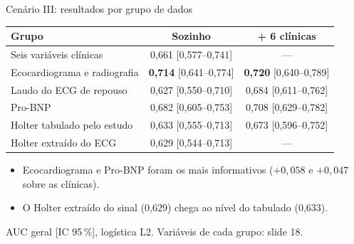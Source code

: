 \documentclass[10pt,aspectratio=169]{beamer}
\newcommand{\fonte}[1]{\par\vfill{\scriptsize\color{cinza}#1}}
\begin{document}
\begin{frame}{Cenário III: resultados por grupo de dados}
  \centering
  \small
  \setlength{\tabcolsep}{6pt}
  \renewcommand{\arraystretch}{1.3}
  \begin{tabular}{lcc}
    \toprule
    \textbf{Grupo} & \textbf{Sozinho} & \textbf{+ 6 clínicas} \\
    \midrule
    Seis variáveis clínicas & 0,661 [0,577--0,741] & --- \\
    Ecocardiograma e radiografia & \textbf{0,714} [0,641--0,774] & \textbf{0,720} [0,640--0,789] \\
    Laudo do ECG de repouso & 0,627 [0,550--0,710] & 0,684 [0,611--0,762] \\
    Pro-BNP & 0,682 [0,605--0,753] & 0,708 [0,629--0,782] \\
    Holter tabulado pelo estudo & 0,633 [0,555--0,713] & 0,673 [0,596--0,752] \\
    Holter extraído do ECG & 0,629 [0,544--0,713] & --- \\
    \bottomrule
  \end{tabular}
  \vspace{0.3cm}
  \begin{itemize}
    \small
    \item Ecocardiograma e Pro-BNP foram os mais informativos
      ($+0{,}058$ e $+0{,}047$ sobre as clínicas).
    \item O Holter extraído do sinal (0,629) chega ao nível do tabulado (0,633).
  \end{itemize}
  \fonte{AUC geral [IC 95\,\%], logística L2. Variáveis de cada grupo: slide 18.}
\end{frame}
\end{document}
